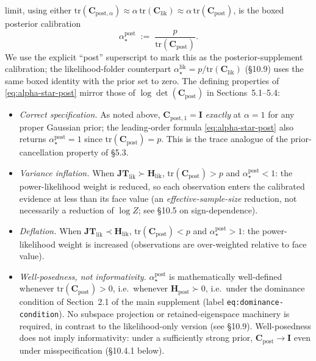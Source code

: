 \documentclass[11pt]{article}
\begin{document}
limit, using either $\mathrm{tr}(\mathbf C_{\mathrm{post},\alpha})
\approx \alpha\,\mathrm{tr}(\mathbf C_{\mathrm{lik}}) \approx \alpha\,
\mathrm{tr}(\mathbf C_{\mathrm{post}})$, is the boxed posterior calibration
\begin{equation}
\boxed{\;
\alpha_\star^{\mathrm{post}}
\;:=\;
\frac{p}{\mathrm{tr}(\mathbf C_{\mathrm{post}})}.
\;}
\label{eq:alpha-star-post}
\end{equation}
We use the explicit ``post'' superscript to mark this as the
posterior-supplement calibration; the likelihood-folder counterpart
$\alpha_\star^{\mathrm{lik}} = p/\mathrm{tr}(\mathbf C_{\mathrm{lik}})$ (\S10.9)
uses the same boxed identity with the prior set to zero. The defining
properties of \eqref{eq:alpha-star-post} mirror those of
$\log\det(\mathbf C_{\mathrm{post}})$ in Sections~5.1--5.4:
\begin{itemize}
\item \emph{Correct specification.} As noted above,
$\mathbf C_{\mathrm{post},1} = \mathbf I$ \emph{exactly} at $\alpha = 1$ for
any proper Gaussian prior; the leading-order formula
\eqref{eq:alpha-star-post} also returns $\alpha_\star^{\mathrm{post}} = 1$
since $\mathrm{tr}(\mathbf C_{\mathrm{post}}) = p$. This is the trace analogue
of the prior-cancellation property of \S5.3.
\item \emph{Variance inflation.} When
$\mathbf{JT}_{\mathrm{lik}} \succ \mathbf H_{\mathrm{lik}}$,
$\mathrm{tr}(\mathbf C_{\mathrm{post}}) > p$ and
$\alpha_\star^{\mathrm{post}} < 1$: the power-likelihood weight is reduced, so
each observation enters the calibrated evidence at less than its face value
(an \emph{effective-sample-size} reduction, not necessarily a reduction of
$\log Z$; see \S10.5 on sign-dependence).
\item \emph{Deflation.} When
$\mathbf{JT}_{\mathrm{lik}} \prec \mathbf H_{\mathrm{lik}}$,
$\mathrm{tr}(\mathbf C_{\mathrm{post}}) < p$ and
$\alpha_\star^{\mathrm{post}} > 1$: the power-likelihood weight is increased
(observations are over-weighted relative to face value).
\item \emph{Well-posedness, not informativity.}
$\alpha_\star^{\mathrm{post}}$ is mathematically well-defined whenever
$\mathrm{tr}(\mathbf C_{\mathrm{post}}) > 0$, i.e.\ whenever
$\mathbf H_{\mathrm{post}} \succ 0$, i.e.\ under the dominance condition of
Section~2.1 of the main supplement
(label \texttt{eq:dominance-condition}). No subspace projection or
retained-eigenspace machinery is required, in contrast to the likelihood-only
version (see \S10.9). Well-posedness does not imply informativity: under a
sufficiently strong prior, $\mathbf C_{\mathrm{post}} \to \mathbf I$ even
under misspecification (\S10.4.1 below).
\end{itemize}
\end{document}
